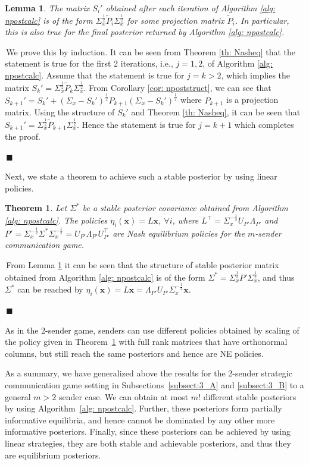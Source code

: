 \documentclass[12pt,journal,onecolumn]{IEEEtran}
\newtheorem{theorem}{Theorem}
\newtheorem{lemma}{Lemma}
\newenvironment{Proof}[1]{\medskip\par\noindent{\bf Proof:\,}\,#1}{{\mbox{\,$\blacksquare$}\par}}
\begin{document}
\begin{lemma}\label{lem: npostproj}
The matrix $S_i'$ obtained after each iteration of Algorithm \ref{alg: npostcalc} is of the form $\Sigma_x^{\frac{1}{2}}\tilde{P}_i\Sigma_x^{\frac{1}{2}}$ for some projection matrix $\tilde{P}_i$. In particular, this is also true for the final posterior returned by Algorithm \ref{alg: npostcalc}.
\end{lemma}
\begin{Proof}
We prove this by induction. It can be seen from Theorem \ref{th: Nasheq} that the statement is true for the first 2 iterations, i.e., $j=1,2$, of Algorithm \ref{alg: npostcalc}. Assume that the statement is true for $j=k>2$, which implies the matrix $S_k'=\Sigma_x^\frac{1}{2}\tilde{P}_k\Sigma_x^{\frac{1}{2}}$. From Corollary \ref{cor: npoststruct}, we can see that $S_{k+1}'=S_k'+(\Sigma_x-S_k')^\frac{1}{2}P_{k+1}(\Sigma_x-S_k')^\frac{1}{2}$ where $P_{k+1}$ is a projection matrix. Using the structure of $S_k'$ and Theorem \ref{th: Nasheq}, it can be seen that $S_{k+1}'=\Sigma_x^{\frac{1}{2}}\tilde{P}_{k+1}\Sigma_x^\frac{1}{2}$. Hence the statement is true for $j=k+1$ which completes the proof.
\end{Proof}
Next, we state a theorem to achieve such a stable posterior by using linear policies.
\begin{theorem}\label{Thm_3}
Let $\Sigma^*$ be a stable posterior covariance obtained from Algorithm \ref{alg: npostcalc}. The policies $\eta_i(\boldsymbol{x})=L\boldsymbol{x}$, $\forall i$, where $L^\top=\Sigma_x^{-\frac{1}{2}}U_{P'}\Lambda_{P'}$ and $P'=\Sigma_x^{-\frac{1}{2}}\Sigma^*\Sigma_x^{-\frac{1}{2}}=U_{P'}\Lambda_{P'}U_{P'}^\top$ are Nash equilibrium policies for the $m$-sender communication game.
\end{theorem}
\begin{Proof}
From Lemma \ref{lem: npostproj} it can be seen that the structure of stable posterior matrix obtained from Algorithm \ref{alg: npostcalc} is of the form $\Sigma^*=\Sigma_x^\frac{1}{2}P'\Sigma_x^\frac{1}{2}$, and thus $\Sigma^*$ can be reached by $\eta_i(\boldsymbol{x})=L\boldsymbol{x}=\Lambda_{P'}U_{P'}\Sigma_x^{-\frac{1}{2}}\boldsymbol{x}$.
\end{Proof}
As in the 2-sender game, senders can use different policies obtained by scaling of the policy given in Theorem~\ref{Thm_3} with full rank matrices that have orthonormal columns, but still reach the same posteriors and hence are NE policies.

As a summary, we have generalized above the results for the 2-sender strategic communication game setting in Subsections~\ref{subsect:3_A} and \ref{subsect:3_B} to a general $m>2$ sender case. We can obtain at most $m!$ different stable posteriors by using Algorithm~\ref{alg: npostcalc}. Further, these posteriors form partially informative equilibria, and hence cannot be dominated by any other more informative posteriors. Finally, since these posteriors can be achieved by using linear strategies, they are both stable and achievable posteriors, and thus they are equilibrium posteriors. 
\end{document}
